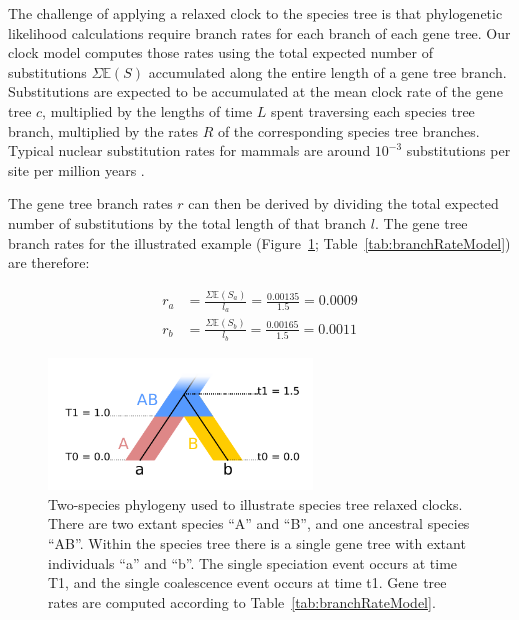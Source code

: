 \documentclass[12pt]{article}
\begin{document}
The challenge of applying a relaxed clock to the species tree is that
phylogenetic likelihood calculations require branch rates for each branch of
each gene tree. Our clock model computes those rates using the total expected
number of substitutions $\Sigma \mathbb{E}(S)$ accumulated along the entire
length of a gene tree branch. Substitutions are expected to be accumulated at
the mean clock rate of the gene tree $c$, multiplied by the lengths of time
$L$ spent traversing each species tree branch, multiplied by the rates $R$ of
the corresponding species tree branches.
Typical nuclear substitution rates for mammals are around $10^{-3}$ substitutions per
site per million years \citep{Phillips06102009}.

The gene tree branch rates $r$ can then be derived by dividing the total
expected number of substitutions by the total length of that branch $l$. The
gene tree branch rates for the illustrated example
(Figure~\ref{fig:branchRateModel}; Table~\ref{tab:branchRateModel}) are
therefore:

\begin{align}
r_a &= \frac{\Sigma \mathbb{E}(S_a)}{l_a} = \frac{0.00135}{1.5} = 0.0009\\
r_b &= \frac{\Sigma \mathbb{E}(S_b)}{l_b} = \frac{0.00165}{1.5} = 0.0011
\end{align}

\begin{figure}[htb!]
\centering
\includegraphics[width=70mm]{relaxed_clock.pdf}
\caption
{Two-species phylogeny used to illustrate species tree relaxed
clocks. There are two extant species ``A'' and ``B'', and one ancestral species ``AB''.
Within the species tree there is a single gene tree with extant individuals ``a''
and ``b''. The single speciation event occurs at time T1, and the single coalescence
event occurs at time t1. Gene tree rates are computed according to Table~\ref{tab:branchRateModel}.}
\label{fig:branchRateModel}
\end{figure}
\end{document}
